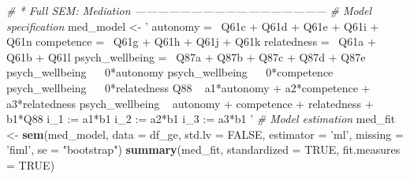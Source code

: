 \documentclass[
]{article}
\newenvironment{Shaded}{\begin{snugshade}}{\end{snugshade}}
\newcommand{\CommentTok}[1]{\textcolor[rgb]{0.56,0.35,0.01}{\textit{#1}}}
\newcommand{\DataTypeTok}[1]{\textcolor[rgb]{0.13,0.29,0.53}{#1}}
\newcommand{\KeywordTok}[1]{\textcolor[rgb]{0.13,0.29,0.53}{\textbf{#1}}}
\newcommand{\NormalTok}[1]{#1}
\newcommand{\OtherTok}[1]{\textcolor[rgb]{0.56,0.35,0.01}{#1}}
\newcommand{\StringTok}[1]{\textcolor[rgb]{0.31,0.60,0.02}{#1}}
\begin{document}
\begin{Shaded}
\begin{Highlighting}[]
\CommentTok{# * Full SEM: Mediation ---------------------------------------------------}
\CommentTok{# Model specification}
\NormalTok{med_model <-}\StringTok{ '}
\StringTok{autonomy =~ Q61c + Q61d + Q61e + Q61i + Q61n}
\StringTok{competence =~ Q61g + Q61h + Q61j + Q61k}
\StringTok{relatedness =~ Q61a + Q61b + Q61l}
\StringTok{psych_wellbeing =~ Q87a + Q87b + Q87c + Q87d + Q87e}
\StringTok{psych_wellbeing ~~ 0*autonomy}
\StringTok{psych_wellbeing ~~ 0*competence}
\StringTok{psych_wellbeing ~~ 0*relatedness}
\StringTok{Q88 ~ a1*autonomy + a2*competence + a3*relatedness}
\StringTok{psych_wellbeing ~ autonomy + competence + relatedness + b1*Q88}
\StringTok{i_1 := a1*b1}
\StringTok{i_2 := a2*b1}
\StringTok{i_3 := a3*b1}
\StringTok{'}
\CommentTok{# Model estimation}
\NormalTok{med_fit <-}\StringTok{ }\KeywordTok{sem}\NormalTok{(med_model,}
               \DataTypeTok{data =}\NormalTok{ df_ge,}
               \DataTypeTok{std.lv =} \OtherTok{FALSE}\NormalTok{,}
               \DataTypeTok{estimator =} \StringTok{'ml'}\NormalTok{,}
               \DataTypeTok{missing =} \StringTok{'fiml'}\NormalTok{,}
               \DataTypeTok{se =} \StringTok{"bootstrap"}\NormalTok{)}
\KeywordTok{summary}\NormalTok{(med_fit,}
        \DataTypeTok{standardized =} \OtherTok{TRUE}\NormalTok{,}
        \DataTypeTok{fit.measures =} \OtherTok{TRUE}\NormalTok{)}
\end{Highlighting}
\end{Shaded}
\end{document}
